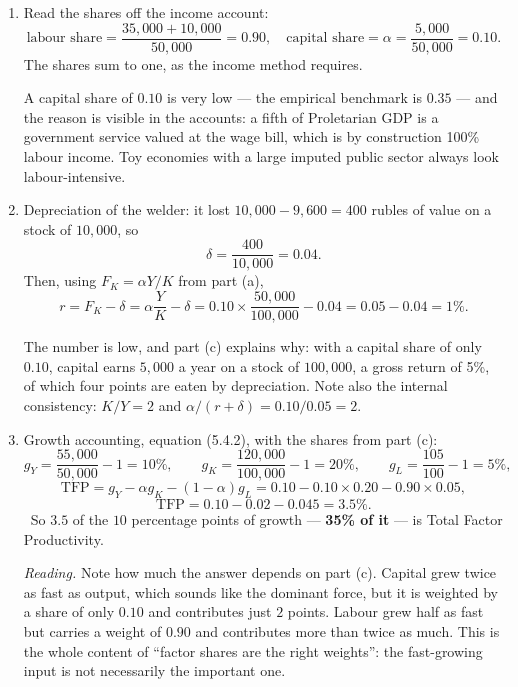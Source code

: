 \documentclass[12pt, letterpaper]{article}
\begin{document}
\begin{tcolorbox}[oddbox,title={Problem 5.7 \quad GDP Accounting, Interest Rates and Growth Accounting}]
\begin{enumerate}
\item Read the shares off the income account:
\[
\text{labour share}=\frac{35{,}000+10{,}000}{50{,}000}=\boxed{0.90},
\quad
\text{capital share}=\alpha=\frac{5{,}000}{50{,}000}=\boxed{0.10} .
\]
The shares sum to one, as the income method requires. \checkmark

\smallskip
A capital share of $0.10$ is very low --- the empirical benchmark is $0.35$ --- and the
reason is visible in the accounts: a fifth of Proletarian GDP is a government service valued
at the wage bill, which is by construction 100\% labour income. Toy economies with a large
imputed public sector always look labour-intensive.

\item Depreciation of the welder: it lost $10{,}000-9{,}600=400$ rubles of value on a stock
of $10{,}000$, so
\[
\delta=\frac{400}{10{,}000}=0.04 .
\]
Then, using $F_K=\alpha Y/K$ from part (a),
\[
r=F_K-\delta=\alpha\frac{Y}{K}-\delta
=0.10\times\frac{50{,}000}{100{,}000}-0.04
=0.05-0.04=\boxed{1\%} .
\]
\checkmark

\smallskip
The number is low, and part (c) explains why: with a capital share of only $0.10$, capital
earns $5{,}000$ a year on a stock of $100{,}000$, a gross return of 5\%, of which four
points are eaten by depreciation. Note also the internal consistency: $K/Y=2$ and
$\alpha/(r+\delta)=0.10/0.05=2$. \checkmark

\item Growth accounting, equation (5.4.2), with the shares from part (c):
\[
g_Y=\frac{55{,}000}{50{,}000}-1=10\%,\qquad
g_K=\frac{120{,}000}{100{,}000}-1=20\%,\qquad
g_L=\frac{105}{100}-1=5\% ,
\]
\[
\text{TFP}=g_Y-\alpha g_K-(1-\alpha)g_L
=0.10-0.10\times0.20-0.90\times0.05 ,
\]
\[
\text{TFP}=0.10-0.02-0.045=\boxed{3.5\%} .
\]
\checkmark\ So $3.5$ of the $10$ percentage points of growth --- \textbf{35\% of it} --- is
Total Factor Productivity.

\smallskip
\emph{Reading.} Note how much the answer depends on part (c). Capital grew twice as fast as
output, which sounds like the dominant force, but it is weighted by a share of only $0.10$
and contributes just $2$ points. Labour grew half as fast but carries a weight of $0.90$ and
contributes more than twice as much. This is the whole content of ``factor shares are the
right weights'': the fast-growing input is not necessarily the important one.

\end{enumerate}
\end{tcolorbox}
\end{document}
